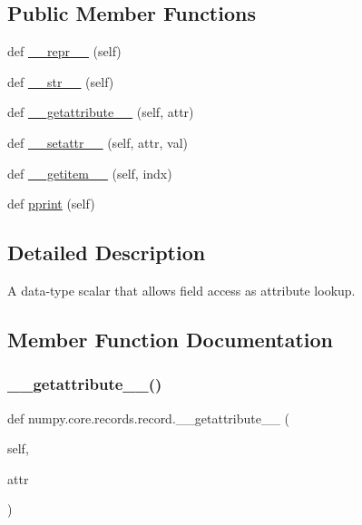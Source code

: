 \subsection*{Public Member Functions}
\begin{DoxyCompactItemize}
\item 
def \hyperlink{classnumpy_1_1core_1_1records_1_1record_a6f86a6fe5465b7c29ccf36ee5141355f}{\+\_\+\+\_\+repr\+\_\+\+\_\+} (self)
\item 
def \hyperlink{classnumpy_1_1core_1_1records_1_1record_ac99f7ca15b16091cc2faf326607b6d20}{\+\_\+\+\_\+str\+\_\+\+\_\+} (self)
\item 
def \hyperlink{classnumpy_1_1core_1_1records_1_1record_a9455fdaf97b85f3ef4a4e840147cebd7}{\+\_\+\+\_\+getattribute\+\_\+\+\_\+} (self, attr)
\item 
def \hyperlink{classnumpy_1_1core_1_1records_1_1record_a2720b4745770c0a10f35ca74c5f2c069}{\+\_\+\+\_\+setattr\+\_\+\+\_\+} (self, attr, val)
\item 
def \hyperlink{classnumpy_1_1core_1_1records_1_1record_af234f6da0ad09950c1c7e65c20cf4205}{\+\_\+\+\_\+getitem\+\_\+\+\_\+} (self, indx)
\item 
def \hyperlink{classnumpy_1_1core_1_1records_1_1record_ab9cd5f03e353edc69f00135eae2161f7}{pprint} (self)
\end{DoxyCompactItemize}


\subsection{Detailed Description}
\begin{DoxyVerb}A data-type scalar that allows field access as attribute lookup.
\end{DoxyVerb}
 

\subsection{Member Function Documentation}
\mbox{\label{classnumpy_1_1core_1_1records_1_1record_a9455fdaf97b85f3ef4a4e840147cebd7}} 
\subsubsection{\texorpdfstring{\+\_\+\+\_\+getattribute\+\_\+\+\_\+()}{\_\_getattribute\_\_()}}
{\footnotesize\ttfamily def numpy.\+core.\+records.\+record.\+\_\+\+\_\+getattribute\+\_\+\+\_\+ (\begin{DoxyParamCaption}\item[{}]{self,  }\item[{}]{attr }\end{DoxyParamCaption})}

